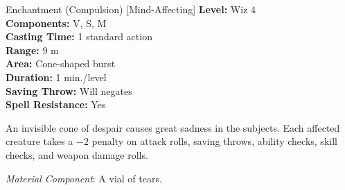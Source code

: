 {Enchantment (Compulsion) [Mind-Affecting]}
{
	\textbf{Level:}
	Wiz 4\\
	\textbf{Components:}
	V, S, M\\
	\textbf{Casting Time:}
	1 standard action\\
	\textbf{Range:}
	9 m\\
	\textbf{Area:}
	Cone-shaped burst\\
	\textbf{Duration:}
	1 min./level\\
	\textbf{Saving Throw:}
	Will negates\\
	\textbf{Spell Resistance:}
	Yes\\
}
{
	An invisible cone of despair causes great sadness in the subjects. Each affected creature takes a $-2$ penalty on attack rolls, saving throws, ability checks, skill checks, and weapon damage rolls.


	\textit{Material Component}:
	A vial of tears.

}
